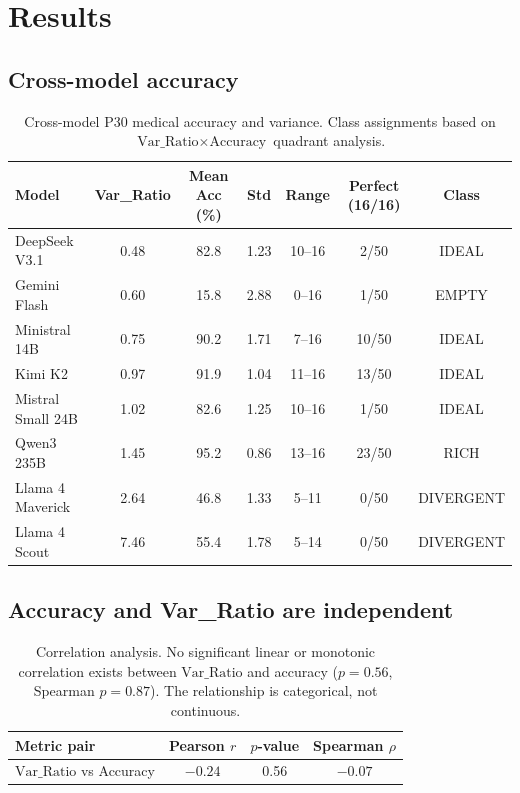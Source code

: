 \documentclass[11pt,a4paper]{article}
\begin{document}
\section{Results}

\subsection{Cross-model accuracy}

\begin{table}[H]
\centering
\begin{tabular}{lcccccc}
\toprule
\textbf{Model} & \textbf{Var\_Ratio} & \textbf{Mean Acc (\%)} & \textbf{Std} & \textbf{Range} & \textbf{Perfect (16/16)} & \textbf{Class} \\
\midrule
DeepSeek V3.1 & 0.48 & 82.8 & 1.23 & 10--16 & 2/50 & IDEAL \\
Gemini Flash & 0.60 & 15.8 & 2.88 & 0--16 & 1/50 & EMPTY \\
Ministral 14B & 0.75 & 90.2 & 1.71 & 7--16 & 10/50 & IDEAL \\
Kimi K2 & 0.97 & 91.9 & 1.04 & 11--16 & 13/50 & IDEAL \\
Mistral Small 24B & 1.02 & 82.6 & 1.25 & 10--16 & 1/50 & IDEAL \\
Qwen3 235B & 1.45 & 95.2 & 0.86 & 13--16 & 23/50 & RICH \\
Llama 4 Maverick & 2.64 & 46.8 & 1.33 & 5--11 & 0/50 & DIVERGENT \\
Llama 4 Scout & 7.46 & 55.4 & 1.78 & 5--14 & 0/50 & DIVERGENT \\
\bottomrule
\end{tabular}
\caption{Cross-model P30 medical accuracy and variance. Class assignments based on $\text{Var\_Ratio} \times \text{Accuracy}$ quadrant analysis.}
\label{tab:accuracy}
\end{table}

\subsection{Accuracy and Var\_Ratio are independent}

\begin{table}[H]
\centering
\begin{tabular}{lccc}
\toprule
\textbf{Metric pair} & \textbf{Pearson $r$} & \textbf{$p$-value} & \textbf{Spearman $\rho$} \\
\midrule
$\text{Var\_Ratio}$ vs Accuracy & $-0.24$ & 0.56 & $-0.07$ \\
\bottomrule
\end{tabular}
\caption{Correlation analysis. No significant linear or monotonic correlation exists between $\text{Var\_Ratio}$ and accuracy ($p = 0.56$, Spearman $p = 0.87$). The relationship is categorical, not continuous.}
\label{tab:correlation}
\end{table}
\end{document}
